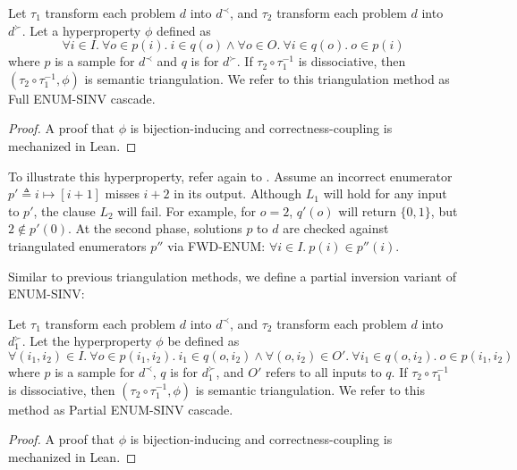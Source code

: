 \documentclass[acmsmall,screen,nonacm]{acmart}
\begin{document}
\begin{proposition}\label{prop:full_enum_sinv}
  Let $\tau_1$ transform each problem $d$ into $d^{\prec}$, and $\tau_2$ transform each problem $d$ into $d^{\succ}$. Let a hyperproperty $\phi$ defined as
\[
\forall i \in I.\ \forall o \in p(i).\ i \in q(o) \wedge \forall o \in O.\ \forall i \in q(o).\ o \in p(i)
\]
where $p$ is a sample for $d^{\prec}$ and $q$ is for $d^{\succ}$. If $\tau_2 \circ \tau_1^{-1}$ is dissociative, then $(\tau_2 \circ \tau_1^{-1}, \phi)$ is semantic triangulation. We refer to this triangulation method as Full ENUM-SINV cascade.
\end{proposition}

\begin{proof}
  A proof that $\phi$ is bijection-inducing and correctness-coupling is mechanized in Lean.
\end{proof}

To illustrate this hyperproperty, refer again to . Assume an incorrect enumerator $p' \triangleq i \mapsto [i+1]$ misses $i+2$ in its output. Although $L_1$ will hold for any input to $p'$, the clause $L_2$ will fail. For example, for $o=2$, $q'(o)$ will return $\{0, 1\}$, but $2\notin p'(0)$. At the second phase, solutions $p$ to $d$ are checked against triangulated enumerators $p''$ via FWD-ENUM: $\forall i\in I.\ p(i) \in p''(i).$

Similar to previous triangulation methods, we define a partial inversion variant of ENUM-SINV:

\begin{proposition}\label{prop:partial_enum_sinv}
  Let $\tau_1$ transform each problem $d$ into $d^{\prec}$, and $\tau_2$ transform each problem $d$ into $d^{\succ}_1$. Let the hyperproperty $\phi$ be defined as
\[
\forall (i_1, i_2) \in I.\ \forall o \in p(i_1, i_2).\ i_1 \in q(o, i_2) \wedge \forall (o, i_2) \in O'.\ \forall i_1 \in q(o, i_2).\ o \in p(i_1, i_2)
\]
where $p$ is a sample for $d^{\prec}$, $q$ is for $d^{\succ}_1$, and $O'$ refers to all inputs to $q$. If $\tau_2 \circ \tau_1^{-1}$ is dissociative, then $(\tau_2 \circ \tau_1^{-1}, \phi)$ is semantic triangulation. We refer to this method as Partial ENUM-SINV cascade.
\end{proposition}

\begin{proof}
  A proof that $\phi$ is bijection-inducing and correctness-coupling is mechanized in Lean.
\end{proof}
\end{document}
